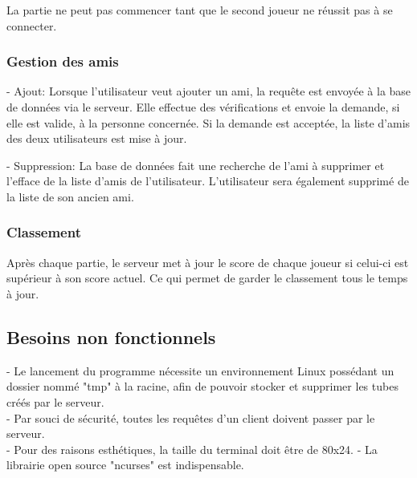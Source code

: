 \documentclass[a4paper,12pt]{article}
\begin{document}
La partie ne peut pas commencer tant que le second joueur ne réussit pas à se connecter.
\subsubsection{Gestion des amis}

- Ajout: Lorsque l'utilisateur veut ajouter un ami, la requête est envoyée à la base de données via le serveur. Elle effectue des vérifications et envoie la demande, si elle est valide, à la personne concernée. Si la demande est acceptée, la liste d'amis des deux utilisateurs est mise à jour.

- Suppression: La base de données fait une recherche de l'ami à supprimer et l'efface de la liste d'amis de l'utilisateur. L'utilisateur sera également supprimé de la liste de son ancien ami.

\subsubsection{Classement}

Après chaque partie, le serveur met à jour le score de chaque joueur si celui-ci est supérieur à son score actuel. 
Ce qui permet de garder le classement tous le temps à jour. 

\subsection{Besoins non fonctionnels}

- Le lancement du programme nécessite un environnement Linux possédant un dossier nommé "tmp" à la racine, afin de pouvoir stocker et supprimer les tubes créés par le serveur.\\
- Par souci de sécurité, toutes les requêtes d'un client doivent passer par le serveur.\\
- Pour des raisons esthétiques, la taille du terminal doit être de 80x24.
- La librairie open source "ncurses" est indispensable.
\end{document}
